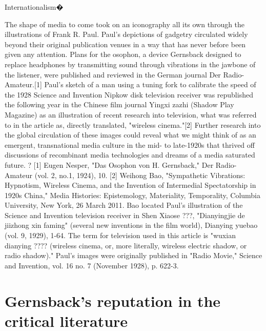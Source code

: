 \documentclass{article}
\begin{document}
Internationalism�

The shape of media to come took on an iconography all its own through the illustrations of Frank R. Paul.  Paul's depictions of gadgetry circulated widely beyond their original publication venues in a way that has never before been given any attention.  Plans for the osophon, a device Gernsback designed to replace headphones by transmitting sound through vibrations in the jawbone of the listener, were published and reviewed in the German journal Der Radio-Amateur.[1]  Paul's sketch of a man using a tuning fork to calibrate the speed of the 1928 Science and Invention Nipkow disk television receiver was republished the following year in the Chinese film journal Yingxi zazhi (Shadow Play Magazine) as an illustration of recent research into television, what was referred to in the article as, directly translated, "wireless cinema."[2]  Further research into the global circulation of these images could reveal what we might think of as an emergent, transnational media culture in the mid- to late-1920s that thrived off discussions of recombinant media technologies and dreams of a media saturated future.
?
[1] Eugen Nesper, "Das Osophon von H. Gernsback," Der Radio-Amateur (vol. 2, no.1, 1924), 10.
[2] Weihong Bao, "Sympathetic Vibrations:  Hypnotism, Wireless Cinema, and the Invention of Intermedial Spectatorship in 1920s China," Media Histories: Epistemology, Materiality, Temporality, Columbia University, New York, 26 March 2011.  Bao located Paul's illustration of the Science and Invention television receiver in Shen Xiaose ???, "Dianyingjie de jiizhong xin faming" (several new inventions in the film world), Dianying yuebao (vol. 9, 1929), 1-64.  The term for television used in this article is "wuxian dianying ???? (wireless cinema, or, more literally, wireless electric shadow, or radio shadow)."  Paul's images were originally published in "Radio Movie," Science and Invention, vol. 16 no. 7 (November 1928), p. 622-3.

\section{Gernsback's reputation in the critical literature}
\end{document}
